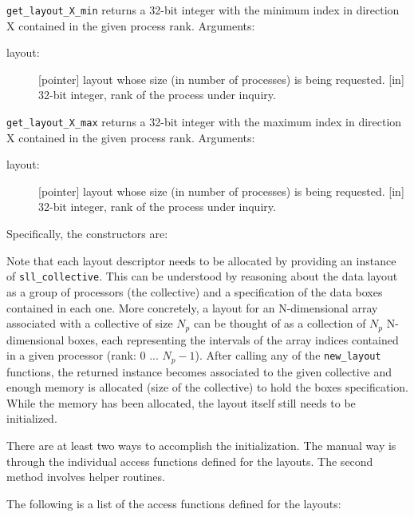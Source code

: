\documentclass[]{report}   %
\begin{document}
\begin{description}
          \item \verb+get_layout_X_min+ returns a 32-bit integer with the minimum index in direction X contained in the given process rank. Arguments:
          \begin{description}
               \item[layout:]
               [pointer] layout whose size (in number of processes) is being requested.
               [in] 32-bit integer, rank of the process under inquiry.
          \end{description}

          \item \verb+get_layout_X_max+ returns a 32-bit integer with the maximum index in direction X contained in the given process rank. Arguments:
          \begin{description}
               \item[layout:]
               [pointer] layout whose size (in number of processes) is being requested.
               [in] 32-bit integer, rank of the process under inquiry.
          \end{description}

          
\end{description}


Specifically, the constructors are:



Note that each layout descriptor needs to be allocated by providing an instance of \verb+sll_collective+. This can be understood by reasoning about the data layout as a group of processors (the collective) and a specification of the data boxes contained in each one. More concretely, a layout for an N-dimensional array associated with a collective of size $N_p$ can be thought of as a collection of $N_p$ N-dimensional boxes, each representing the intervals of the array indices contained in a given processor (rank: 0 ... $N_p-1$). After calling any of the \verb+new_layout+ functions, the returned instance becomes associated to the given collective and enough memory is allocated (size of the collective) to hold the boxes specification. While the memory has been allocated, the layout itself still needs to be initialized.

There are at least two ways to accomplish the initialization. The manual way is through the individual access functions defined for the layouts. The second method involves helper routines. 

The following is a list of the access functions defined for the layouts:
\end{document}
